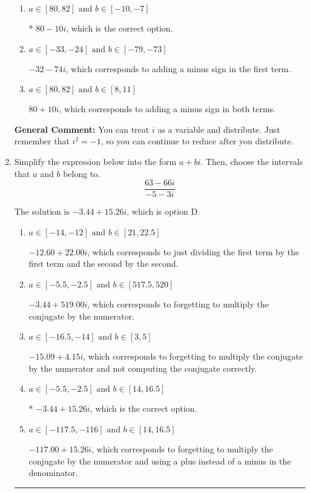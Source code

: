 \documentclass{extbook}[14pt]
\newcommand{\litem}[1]{\item #1

\rule{\textwidth}{0.4pt}}
\begin{document}
\begin{enumerate}
{\begin{enumerate}[label=\Alph*.]
 $24 - 56 i$, which corresponds to just multiplying the real terms to get the real part of the solution and the coefficients in the complex terms to get the complex part.
\item \( a \in [80, 82] \text{ and } b \in [-10, -7] \)

* $80 - 10 i$, which is the correct option.
\item \( a \in [-33, -24] \text{ and } b \in [-79, -73] \)

 $-32 - 74 i$, which corresponds to adding a minus sign in the first term.
\item \( a \in [80, 82] \text{ and } b \in [8, 11] \)

 $80 + 10 i$, which corresponds to adding a minus sign in both terms.
\end{enumerate}

\textbf{General Comment:} You can treat $i$ as a variable and distribute. Just remember that $i^2=-1$, so you can continue to reduce after you distribute.
}
\litem{
Simplify the expression below into the form $a+bi$. Then, choose the intervals that $a$ and $b$ belong to.
\[ \frac{63 - 66 i}{-5 - 3 i} \]

The solution is \( -3.44  + 15.26 i \), which is option D.\begin{enumerate}[label=\Alph*.]
\item \( a \in [-14, -12] \text{ and } b \in [21, 22.5] \)

 $-12.60  + 22.00 i$, which corresponds to just dividing the first term by the first term and the second by the second.
\item \( a \in [-5.5, -2.5] \text{ and } b \in [517.5, 520] \)

 $-3.44  + 519.00 i$, which corresponds to forgetting to multiply the conjugate by the numerator.
\item \( a \in [-16.5, -14] \text{ and } b \in [3, 5] \)

 $-15.09  + 4.15 i$, which corresponds to forgetting to multiply the conjugate by the numerator and not computing the conjugate correctly.
\item \( a \in [-5.5, -2.5] \text{ and } b \in [14, 16.5] \)

* $-3.44  + 15.26 i$, which is the correct option.
\item \( a \in [-117.5, -116] \text{ and } b \in [14, 16.5] \)

 $-117.00  + 15.26 i$, which corresponds to forgetting to multiply the conjugate by the numerator and using a plus instead of a minus in the denominator.
\end{enumerate}

}
\end{enumerate}
\end{document}
